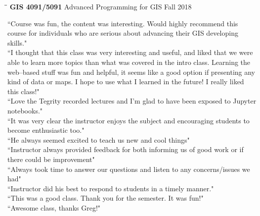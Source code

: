 \documentclass{res}
\begin{document}
\begin{resume}
\begin{tabbing}
	\hspace{2.3in}\= \hspace{2.6in}\= \kill %
	{\bf GIS 4091/5091} \>Advanced Programming for GIS     \>Fall 2018\\
	\>
\end{tabbing}\vspace{-20pt}      %
``Course was fun, the content was interesting. Would highly recommend this course for individuals who are serious about advancing their GIS developing skills."\\
``I thought that this class was very interesting and useful, and liked that we were able to learn more topics than what was covered in the intro class. Learning the web–based stuff was fun and helpful, it seems like a good option if presenting any kind of data or maps. I hope to use what I learned in the future! I really liked this class!"\\
``Love the Tegrity recorded lectures and I'm glad to have been exposed to Jupyter notebooks."\\
``It was very clear the instructor enjoys the subject and encouraging students to become enthusiastic too."\\
``He always seemed excited to teach us new and cool things"\\
``Instructor always provided feedback for both informing us of good work or if there could be improvement"\\
``Always took time to answer our questions and listen to any concerns/issues we had"\\
``Instructor did his best to respond to students in a timely manner."\\
``This was a good class. Thank you for the semester. It was fun!"\\
``Awesome class, thanks Greg!"\\

\end{resume}
\end{document}

